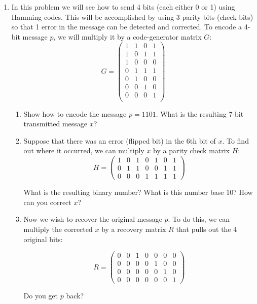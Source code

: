 \documentclass[11pt]{article}
\newif\ifsolutions
\begin{document}
\begin{enumerate}
\ifsolutions 
\textbf{Solutions:} \fi



\item In this problem we will see how to send 4 bits (each either 0 or 1) using Hamming codes. This will be accomplished by using 3 parity bits (check bits) so that 1 error in the message can be detected and corrected. To encode a 4-bit message $p$, we will multiply it by a code-generator matrix $G$:
\[ G = \left( \begin{array}{cccc} 1 & 1 & 0 & 1 \\
1 & 0 & 1 & 1 \\
1 & 0 & 0 & 0 \\
0 & 1 & 1 & 1 \\
0 & 1 & 0 & 0 \\
0 & 0 & 1 & 0 \\
0 & 0 & 0 & 1 \\
\end{array} \right)
\]   

\begin{enumerate}

\item Show how to encode the message $p=1101$.  What is the resulting 7-bit transmitted message $x$?
\item Suppose that there was an error (flipped bit) in the 6th bit of $x$. To find out where it occurred, we can multiply $x$ by a parity check matrix $H$:
\[ H = \left( \begin{array}{ccccccc} 1 & 0 & 1 & 0 & 1 & 0 & 1 \\
0 & 1 & 1 & 0 & 0 & 1 & 1 \\
0 & 0 & 0 & 1 & 1 & 1 & 1
\end{array} \right)
\]   

What is the resulting binary number?  What is this number base 10? How can you correct $x$?

\item Now we wish to recover the original message $p$. To do this, we can multiply the corrected $x$ by a recovery matrix $R$ that pulls out the 4 original bits:

\[ R = \left( \begin{array}{ccccccc} 0 & 0 & 1 & 0 & 0 & 0 & 0 \\
0 & 0 & 0 & 0 & 1 & 0 & 0 \\
0 & 0 & 0 & 0 & 0 & 1 & 0 \\
0 & 0 & 0 & 0 & 0 & 0 & 1
\end{array} \right)
\]   

Do you get $p$ back?
\end{enumerate}
 \end{enumerate}
\end{document}
